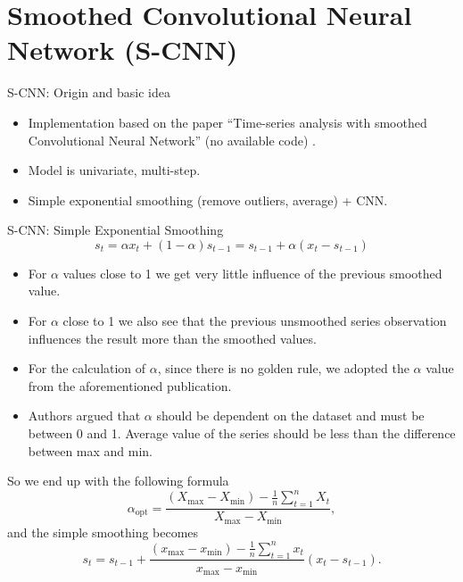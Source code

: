 \documentclass[aspectratio=169, 12pt]{beamer}
\begin{document}
\section{Smoothed Convolutional Neural Network (S-CNN)}

\begin{frame}{S-CNN: Origin and basic idea}
    \begin{itemize}
        \item Implementation based on the paper ``Time-series analysis with smoothed Convolutional Neural Network''\cite{e-cnn} (no available code) .
        \item Model is univariate, multi-step.
        \item Simple exponential smoothing (remove outliers, average) + CNN.
    \end{itemize}
\end{frame}

\begin{frame}[allowframebreaks]{S-CNN: Simple Exponential Smoothing}
  \begin{equation*}
    \displaystyle s_{t}=\alpha x_{t}+(1-\alpha )s_{t-1}=s_{t-1}+\alpha (x_{t}-s_{t-1})
  \end{equation*}
    \begin{itemize}
        \item For $\alpha$ values close to 1 we get very little influence of the previous smoothed value.
        \item For $\alpha$ close to 1 we also see that the previous unsmoothed series observation influences the result more than the smoothed values.
        \item For the calculation of $\alpha$, since there is no golden rule, we adopted the $\alpha$ value from the aforementioned publication.
        \item Authors argued that $\alpha$ should be dependent on the dataset and must be between 0 and 1. Average value of the series should be less than the difference between max and min.
    \end{itemize}
So we end up with the following formula
\begin{equation*}
\alpha_{\text{opt}} = \frac{\left( X_{\text{max}} - X_{\text{min}} \right) - \frac{1}{n} \sum_{t=1}^{n} X_t}{X_{\text{max}} - X_{\text{min}}},
\end{equation*}
and the simple smoothing becomes
\begin{equation*}
s_t = s_{t-1} + \frac{\left( x_{\text{max}} - x_{\text{min}} \right) - \frac{1}{n} \sum_{t=1}^{n} x_t}{x_{\text{max}} - x_{\text{min}}} \left( x_t - s_{t-1} \right) .
\end{equation*}
\end{frame}
\end{document}
